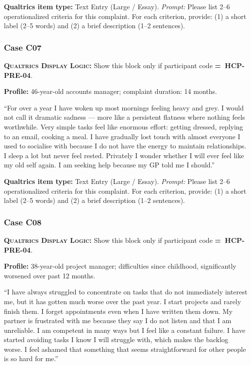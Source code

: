 \documentclass[11pt,a4paper]{article}
\newcommand{\responsetextarea}[1]{\begin{tcolorbox}[colback=ResponseBG,colframe=GoldAmber,boxrule=0.6pt,arc=1.5mm,left=6pt,right=6pt,top=5pt,bottom=5pt]\small\textbf{\color{GoldAmber}Qualtrics item type:} Text Entry (Large / Essay). \quad \textit{Prompt:} #1\end{tcolorbox}}
\newcommand{\dlnote}[1]{\par\vspace{0.15em}\noindent\begin{tcolorbox}[colback=AccentAmber,colframe=GoldAmber,boxrule=0.45pt,arc=1mm,left=5pt,right=5pt,top=2.5pt,bottom=2.5pt]\footnotesize\textbf{\color{GoldAmber}\scshape Qualtrics Display Logic:} Show this block only if participant code \textbf{=~#1}.\end{tcolorbox}\vspace{0.1em}}
\begin{document}
\responsetextarea{Please list 2--6 operationalized criteria for this complaint. For each criterion, provide: (1) a short label (2--5 words) and (2) a brief description (1--2 sentences).}

\vspace{0.4em}
\subsubsection*{Case C07}
\dlnote{HCP-PRE-04}

\begin{complaintbox}[title=Case C07 --- Complaint Vignette]
\textbf{Profile:} 46-year-old accounts manager; complaint duration: 14 months.

\smallskip
``For over a year I have woken up most mornings feeling heavy and grey. I would not call it dramatic sadness --- more like a persistent flatness where nothing feels worthwhile. Very simple tasks feel like enormous effort: getting dressed, replying to an email, cooking a meal. I have gradually lost touch with almost everyone I used to socialise with because I do not have the energy to maintain relationships. I sleep a lot but never feel rested. Privately I wonder whether I will ever feel like my old self again. I am seeking help because my GP told me I should.''
\end{complaintbox}

\responsetextarea{Please list 2--6 operationalized criteria for this complaint. For each criterion, provide: (1) a short label (2--5 words) and (2) a brief description (1--2 sentences).}

\vspace{0.4em}
\subsubsection*{Case C08}
\dlnote{HCP-PRE-04}

\begin{complaintbox}[title=Case C08 --- Complaint Vignette]
\textbf{Profile:} 38-year-old project manager; difficulties since childhood, significantly worsened over past 12 months.

\smallskip
``I have always struggled to concentrate on tasks that do not immediately interest me, but it has gotten much worse over the past year. I start projects and rarely finish them. I forget appointments even when I have written them down. My partner is frustrated with me because they say I do not listen and that I am unreliable. I am competent in many ways but I feel like a constant failure. I have started avoiding tasks I know I will struggle with, which makes the backlog worse. I feel ashamed that something that seems straightforward for other people is so hard for me.''
\end{complaintbox}
\end{document}
